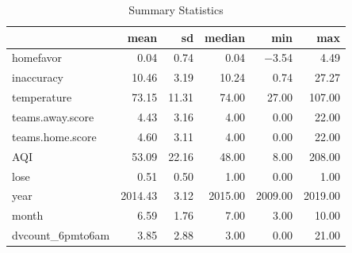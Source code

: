\begin{table}
\centering
\caption{Summary Statistics}
\centering
\begin{tabular}[t]{lrrrrr}
\toprule
  & mean & sd & median & min & max\\
\midrule
homefavor & \num{0.04} & \num{0.74} & \num{0.04} & \num{-3.54} & \num{4.49}\\
inaccuracy & \num{10.46} & \num{3.19} & \num{10.24} & \num{0.74} & \num{27.27}\\
temperature & \num{73.15} & \num{11.31} & \num{74.00} & \num{27.00} & \num{107.00}\\
teams.away.score & \num{4.43} & \num{3.16} & \num{4.00} & \num{0.00} & \num{22.00}\\
teams.home.score & \num{4.60} & \num{3.11} & \num{4.00} & \num{0.00} & \num{22.00}\\
AQI & \num{53.09} & \num{22.16} & \num{48.00} & \num{8.00} & \num{208.00}\\
lose & \num{0.51} & \num{0.50} & \num{1.00} & \num{0.00} & \num{1.00}\\
year & \num{2014.43} & \num{3.12} & \num{2015.00} & \num{2009.00} & \num{2019.00}\\
month & \num{6.59} & \num{1.76} & \num{7.00} & \num{3.00} & \num{10.00}\\
dvcount\_6pmto6am & \num{3.85} & \num{2.88} & \num{3.00} & \num{0.00} & \num{21.00}\\
\bottomrule
\end{tabular}
\end{table}

